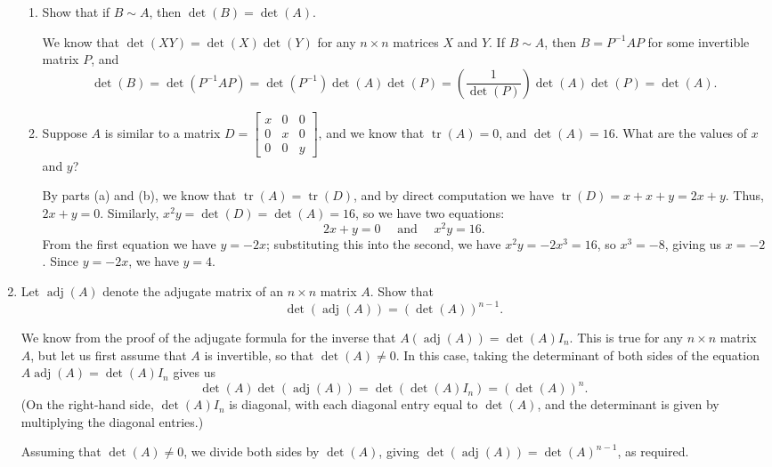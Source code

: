 \documentclass[letterpaper,12pt]{article}
\newcommand{\bbm}{\begin{bmatrix}}
\newcommand{\ebm}{\end{bmatrix}}
\begin{document}
\begin{enumerate}
\begin{enumerate}
 \item Show that if $B\sim A$, then $\det(B)=\det(A)$.

We know that $\det(XY) = \det(X)\det(Y)$ for any $n\times n$ matrices $X$ and $Y$. If $B\sim A$, then $B=P^{-1}AP$ for some invertible matrix $P$, and
\[
 \det(B) = \det(P^{-1}AP) = \det(P^{-1})\det(A)\det(P) = \left(\frac{1}{\det(P)}\right)\det(A)\det(P) = \det(A).
\]

\medskip

 \item Suppose $A$ is similar to a matrix $D = \bbm x&0&0\\0&x&0\\0&0&y\ebm$, and we know that $\operatorname{tr}(A)=0$, and $\det(A)=16$. What are the values of $x$ and $y$?

\medskip

By parts (a) and (b), we know that $\operatorname{tr}(A) = \operatorname{tr}(D)$, and by direct computation we have $\operatorname{tr}(D) = x+x+y = 2x+y$. Thus, $2x+y = 0$. Similarly, $x^2y = \det(D) = \det(A) = 16$, so we have two equations:
\[
 2x+y = 0 \quad \text{ and } \quad x^2y=16.
\]
From the first equation we have $y=-2x$; substituting this into the second, we have $x^2y = -2x^3 = 16$, so $x^3=-8$, giving us $x=-2$. Since $y=-2x$, we have $y=4$.

\end{enumerate}

\medskip


\item Let $\operatorname{adj}(A)$ denote the adjugate matrix of an $n\times n$ matrix $A$. Show that 
\[\det(\operatorname{adj}(A)) = (\det(A))^{n-1}.\]

\medskip

We know from the proof of the adjugate formula for the inverse that $A(\operatorname{adj}(A)) = \det(A)I_n$. This is true for any $n\times n$ matrix $A$, but let us first assume that $A$ is invertible, so that $\det(A)\neq 0$. In this case, taking the determinant of both sides of the equation $A\operatorname{adj}(A)=\det(A)I_n$ gives us
\[
 \det(A)\det(\operatorname{adj}(A)) = \det(\det(A)I_n)=(\det(A))^n.
\]
(On the right-hand side, $\det(A)I_n$ is diagonal, with each diagonal entry equal to $\det(A)$, and the determinant is given by multiplying the diagonal entries.)

Assuming that $\det(A)\neq 0$, we divide both sides by $\det(A)$, giving $\det(\operatorname{adj}(A))=\det(A)^{n-1}$, as required.


\end{enumerate}
\end{document}
